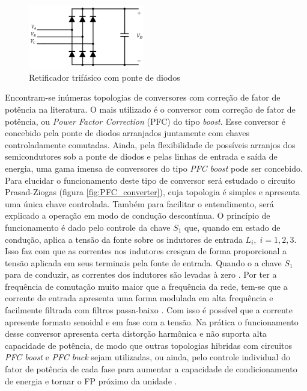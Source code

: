 \begin{figure}[!htbp] %
	\centering
	\includegraphics[width=0.45\textwidth]{Cap2/Figuras/3ph_rectifier.png}
	\caption{Retificador trifásico com ponte de diodos}
	\label{fig:3ph_rectifier}
\end{figure}

Encontram-se inúmeras topologias de conversores com correção de fator de potência na literatura. O mais utilizado é o conversor com correção de fator de potência, ou \textit{Power Factor Correction} (PFC) do tipo \textit{boost}. Esse conversor é concebido pela ponte de diodos arranjados juntamente com chaves controladamente comutadas. Ainda, pela flexibilidade de possíveis arranjos dos semicondutores sob a ponte de diodos e pelas linhas de entrada e saída de energia, uma gama imensa de conversores do tipo \textit{PFC boost} pode ser concebido. Para elucidar o funcionamento deste tipo de conversor será estudado o circuito Prasad-Ziogas (figura \ref{fig:PFC_converter}), cuja topologia é simples e apresenta uma única chave controlada. Também para facilitar o entendimento, será explicado a operação em modo de condução descontínua. O princípio de funcionamento é dado pelo controle da chave $S_1$ que, quando em estado de condução, aplica a tensão da fonte sobre os indutores de entrada $L_i,\;i=1,2,3$. Isso faz com que as correntes nos indutores cresçam de forma proporcional a tensão aplicada em seus terminais pela fonte de entrada. Quando o a chave $S_1$ para de conduzir, as correntes dos indutores são levadas à zero . Por ter a frequência de comutação muito maior que a frequência da rede, tem-se que a corrente de entrada apresenta uma forma modulada em alta frequência e facilmente filtrada com filtros passa-baixo \cite{Nairus1996, Takeuchi2008}. Com isso é possível que a corrente apresente formato senoidal e em fase com a tensão. Na prática o funcionamento desse conversor apresenta certa distorção harmônica e não suporta alta capacidade de potência, de modo que outras topologias hibridas com circuitos \textit{PFC boost} e \textit{PFC buck} sejam utilizadas, ou ainda, pelo controle individual do fator de potência de cada fase para aumentar a capacidade de condicionamento de energia e tornar o FP próximo da unidade \cite{Kolar2011}.


